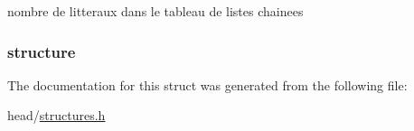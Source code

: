 nombre de litteraux dans le tableau de listes chainees 

\hypertarget{structliste_ae8dc45b36e2c6c8df319517f1d0d45d4}{
\subsubsection[{structure}]{ structure}}\label{structliste_ae8dc45b36e2c6c8df319517f1d0d45d4}


The documentation for this struct was generated from the following file\-:\begin{DoxyCompactItemize}
\item 
head/\hyperlink{structures_8h}{structures.\-h}\end{DoxyCompactItemize}
